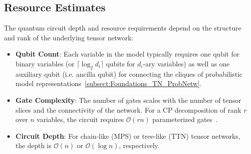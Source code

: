 \documentclass[encoding=utf8,british]{tumphthesis}
\begin{document}
        \subsection{Resource Estimates}
            The quantum circuit depth and resource requirements depend on the structure and rank of the underlying tensor network:
            \begin{itemize}
                \item \textbf{Qubit Count}: Each variable in the model typically requires one qubit for binary variables (or 
                $\lceil \log_2 d_i \rceil$ qubits for $d_i$-ary variables) as well as one auxiliary qubit (i.e. ancilla qubit) for connecting the 
                cliques of probabilistic model representations~\ref{subsect:Foundations_TN_ProbNetw}.
                \item \textbf{Gate Complexity}: The number of gates scales with the number of tensor slices and the connectivity of the network. 
                For a CP decomposition of rank $r$ over $n$ variables, the circuit requires $\mathcal{O}(rn)$ parameterized gates~\cite{CPdecomp}.
                \item \textbf{Circuit Depth}: For chain-like (MPS) or tree-like (TTN) tensor networks, the depth is $\mathcal{O}(n)$ or $\mathcal{O}(\log n)$, respectively.
            \end{itemize}
\end{document}
